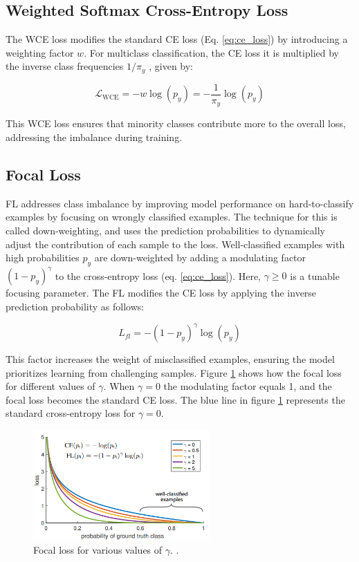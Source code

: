 \subsection{Weighted Softmax Cross-Entropy Loss}
\label{sec:wce_loss}
The WCE loss modifies the standard CE loss (Eq. \eqref{eq:ce_loss}) by introducing a weighting factor $w$. For multiclass classification, the CE loss it is multiplied by the inverse class frequencies $1/\pi_y$ \cite{zhang2023deep,lin2018focallossdenseobject}, given by:

\begin{equation}
    \label{eq:wce_loss}
    \mathcal{L}_{\text{WCE}} = -w \log(p_y) = - \frac{1}{\pi_y} \log(p_y)
\end{equation}

\noindent This WCE loss ensures that minority classes contribute more to the overall loss, addressing the imbalance during training.


\subsection{Focal Loss}
\label{sec:fl}
FL \cite{lin2018focallossdenseobject} addresses class imbalance by improving model performance on hard-to-classify examples by focusing on wrongly classified examples. The technique for this is called down-weighting, and uses the prediction probabilities to dynamically adjust the contribution of each sample to the loss. Well-classified examples with high probabilities $p_y$ are down-weighted by adding a modulating factor $(1 - p_y)^\gamma$ to the cross-entropy loss (eq. \eqref{eq:ce_loss}). Here, $\gamma \geq 0$ is a tunable focusing parameter. The FL modifies the CE loss by applying the inverse prediction probability as follows:

\begin{equation}
    \label{eq:focal_loss}
    L_{fl} = -(1 - p_y)^\gamma \log(p_y)
\end{equation}

\noindent This factor increases the weight of misclassified examples, ensuring the model prioritizes learning from challenging samples. Figure \ref{fig:focal_loss} shows how the focal loss for different values of $\gamma$. When $\gamma = 0$ the modulating factor equals 1, and the focal loss becomes the standard CE loss. The blue line in figure \ref{fig:focal_loss} represents the standard cross-entropy loss for $\gamma = 0$.

\begin{figure}[h!]
    \centering
    \includegraphics[width=0.6\textwidth]{Images/focal_loss.png}
    \caption{Focal loss for various values of $\gamma$. \cite{lin2018focallossdenseobject}.}
    \label{fig:focal_loss}
\end{figure}

